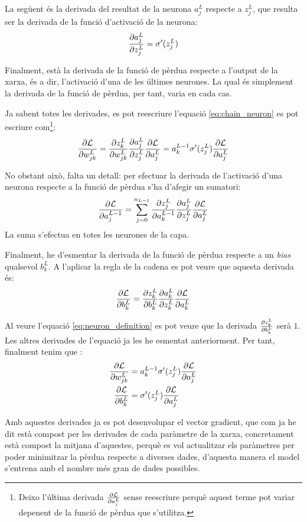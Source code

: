 La següent és la derivada del resultat de la neurona $a_j^L$ respecte a $z_j^L$, que resulta ser la derivada de la funció d'activació de la neurona:
\begin{equation*}
	\pdv{a_j^L}{z_j^L} = \sigma'(z_j^L)
\end{equation*}

Finalment, està la derivada de la funció de pèrdua respecte a l'output de la xarxa, és a dir, l'activació d'una de les últimes neurones. La qual és simplement la derivada de la funció de pèrdua, per tant, varia en cada cas.

Ja sabent totes les derivades, es pot reescriure l'equació \ref{eq:chain_neuron} es pot escriure com\footnote{Deixo l'última derivada $\pdv{\mathcal{L}}{a_j^L}$ sense reescriure perquè aquest terme pot variar depenent de la funció de pèrdua que s'utilitza.}:
$$
	\pdv{\mathcal{L}}{w_{jk}^L} = \pdv{z_k^L}{w_{jk}^L}\pdv{a_j^L}{z_j^L}\pdv{\mathcal{L}}{a_j^L} = 
	a^{L-1}_k \sigma'(z_j^L)\pdv{\mathcal{L}}{a_j^L}
$$

No obstant això, falta un detall: per efectuar la derivada de l'activació d'una neurona respecte a la funció de pèrdua s'ha d'afegir un sumatori:
$$
\pdv{\mathcal{L}}{a_j^{L-1}} = \sum_{j=0}^{n_{L-1}} \pdv{z_j^L}{a_k^{L-1}}\pdv{a_j^L}{z_j^L}\pdv{\mathcal{L}}{a_j^L}
$$
La suma s'efectua en totes les neurones de la capa.

Finalment, he d'esmentar la derivada de la funció de pèrdua respecte a un \textit{bias} qualsevol $ b^L_k$. A l'aplicar la regla de la cadena es pot veure que aquesta derivada és:
\begin{equation*}
	\pdv{\mathcal{L}}{b^L_k} = \pdv{z^L_{k}}{b^L_{k}}\pdv{a^L_{k}}{z^L_{k}}\pdv{\mathcal{L}}{a^L_{k}}
\end{equation*}

Al veure l'equació \ref{eq:neuron_definition} es pot veure que la derivada $ \pdv{z^{L}_{k}}{b^{L}_{k}}$ serà $1$. Les altres derivades de l'equació ja les he esmentat anteriorment. Per tant, finalment tenim que \cite{3b1b}:
\begin{align*}
	\pdv{\mathcal{L}}{w_{jk}^L} &= a^{L-1}_k \sigma'(z_j^L)\pdv{\mathcal{L}}{a_j^L} \\
	\pdv{\mathcal{L}}{b^L_k} &= \sigma'(z_j^L)\pdv{\mathcal{L}}{a_j^L}
\end{align*}

Amb aquestes derivades ja es pot desenvolupar el vector gradient, que com ja he dit està compost per les derivades de cada paràmetre de la xarxa, concretament està compost la mitjana d'aquestes, perquè es vol actualitzar els paràmetres per poder minimitzar la pèrdua respecte a diverses dades, d'aquesta manera el model s'entrena amb el nombre més gran de dades possibles.

